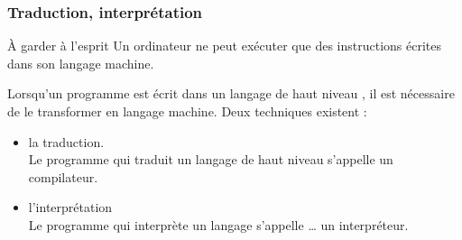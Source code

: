 \documentclass[utf8,10pt]{beamer}
\begin{document}
\begin{frame}
    \frametitle{Traduction, interprétation}
    
    \begin{exampleblock}{À garder à l'esprit}
        Un ordinateur ne peut exécuter que des instructions écrites dans son langage machine.
    \end{exampleblock}
    
    \vfill
    
    Lorsqu'un programme est écrit dans un langage de \og haut niveau \fg , il est nécessaire
    de le transformer en langage machine. Deux techniques existent :
    \begin{itemize}
        \item la \alert{traduction}.\\ Le programme qui traduit un langage de \og haut niveau \fg{}
        s'appelle un \alert{compilateur}.
        \item l'\alert{interprétation}\\ Le programme qui interprète un langage s'appelle \ldots 
        un \alert{interpréteur}.
    \end{itemize}

\end{frame}
\end{document}
